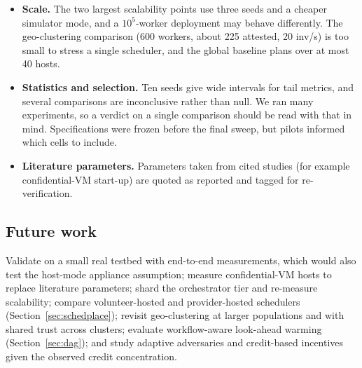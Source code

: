 \begin{itemize}
\item \textbf{Scale.} The two largest scalability points use three seeds and a cheaper simulator mode, and a $10^5$-worker deployment may behave differently. The geo-clustering comparison (600 workers, about 225 attested, 20 inv/s) is too small to stress a single scheduler, and the global baseline plans over at most 40 hosts.
\item \textbf{Statistics and selection.} Ten seeds give wide intervals for tail metrics, and several comparisons are inconclusive rather than null. We ran many experiments, so a verdict on a single comparison should be read with that in mind. Specifications were frozen before the final sweep, but pilots informed which cells to include.
\item \textbf{Literature parameters.} Parameters taken from cited studies (for example confidential-VM start-up) are quoted as reported and tagged for re-verification.
\end{itemize}

\subsection{Future work}
Validate on a small real testbed with end-to-end measurements, which would also test the host-mode appliance assumption; measure confidential-VM hosts to replace literature parameters; shard the orchestrator tier and re-measure scalability; compare volunteer-hosted and provider-hosted schedulers (Section~\ref{sec:schedplace}); revisit geo-clustering at larger
populations and with shared trust across clusters; evaluate workflow-aware look-ahead warming (Section~\ref{sec:dag}); and study adaptive adversaries and credit-based incentives given the observed credit concentration.
